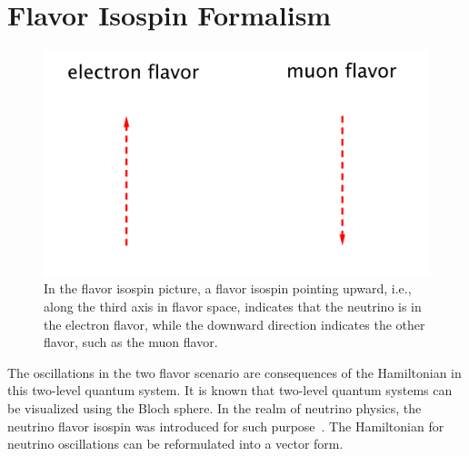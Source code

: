 \section{\label{chap:basics-sec:flavor-isospin-pic}Flavor Isospin Formalism}


\begin{figure}
    \centering
    \vspace*{-10pt}
    \includegraphics[width=\textwidth]{chapters/assets/basics/flavor-isospin-illus}
    \caption{In the flavor isospin picture, a flavor isospin pointing upward, i.e., along the third axis in flavor space, indicates that the neutrino is in the electron flavor, while the downward direction indicates the other flavor, such as the muon flavor.}
    \label{chap:basics-sec:flavor-isospin-pic-fig:flavor-isospin-illus}
\end{figure}

The oscillations in the two flavor scenario are consequences of the Hamiltonian in this two-level quantum system. It is known that two-level quantum systems can be visualized using the Bloch sphere. In the realm of neutrino physics, the neutrino flavor isospin was introduced for such purpose~\cite{Duan2006b}. The Hamiltonian for neutrino oscillations can be reformulated into a vector form.

